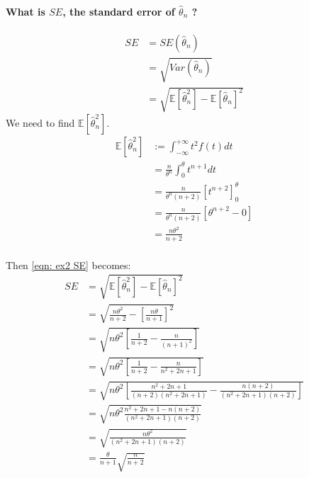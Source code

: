 \documentclass{article}
\newcommand{\E}{\mathbb{E}}
\newcommand{\thetahat}{\hat\theta}
\begin{document}
\paragraph{What is \(SE\), the standard error of \(\hat\theta_n\) ?\\}

\begin{align}
    SE
    \nonumber
     & = SE(\thetahat_n)                              \\
    \nonumber
     & = \sqrt{Var(\thetahat_n)}                      \\
    \label{eqn: ex2 SE}
     & = \sqrt{\E[\thetahat_n^2] - \E[\thetahat_n]^2}
\end{align}
We need to find \(\E[\thetahat_n^2]\).
\begin{align*}
    \E[\thetahat_n^2]
     & := \int_{-\infty}^{+\infty} t^2 f(t) dt                      \\
     & = \frac{n}{\theta^n} \int_{0}^{\theta} t^{n+1} dt            \\
     & = \frac{n}{\theta^n (n+2)} \left[t^{n+2}\right]_{0}^{\theta} \\
     & = \frac{n}{\theta^n (n+2)} \left[\theta^{n+2} - 0\right]     \\
     & = \frac{n \theta^2}{n+2}                                     \\
\end{align*}

Then \eqref{eqn: ex2 SE} becomes:
\begin{align*}
    SE
     & = \sqrt{\E[\thetahat_n^2] - \E[\thetahat_n]^2}                                                                   \\
     & = \sqrt{\frac{n \theta^2}{n+2} - \left[ \frac{n \theta}{n+1} \right]^2}                                          \\
     & = \sqrt{n \theta^2 \left[ \frac{1}{n+2} - \frac{n}{(n+1)^2} \right]}                                             \\
     & = \sqrt{n \theta^2 \left[ \frac{1}{n+2} - \frac{n}{n^2 + 2n + 1} \right]}                                        \\
     & = \sqrt{n \theta^2 \left[ \frac{n^2 + 2n + 1}{(n+2)(n^2 + 2n + 1)} - \frac{n(n+2)}{(n^2 + 2n + 1)(n+2)} \right]} \\
     & = \sqrt{n \theta^2 \frac{n^2 + 2n + 1 - n(n+2)}{(n^2 + 2n + 1)(n+2)} }                                           \\
     & = \sqrt{\frac{n \theta^2}{(n^2 + 2n + 1)(n+2)} }                                                                 \\
     & = \frac{\theta}{n+1} \sqrt{\frac{n}{n+2}}                                                                        \\
\end{align*}
\end{document}
